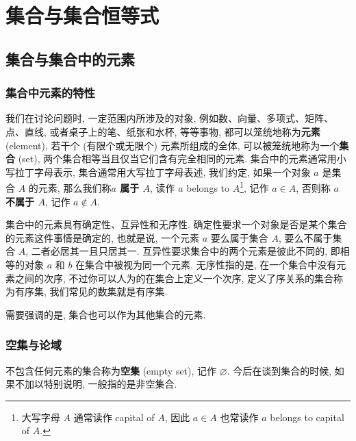 \documentclass[10pt,UTF8]{book} %
\begin{document}
\section{集合与集合恒等式}

\subsection{集合与集合中的元素}

\subsubsection{集合中元素的特性}

我们在讨论问题时, 一定范围内所涉及的对象, 例如数、向量、多项式、矩阵、点、直线,
或者桌子上的笔、纸张和水杯, 等等事物, 都可以笼统地称为\textbf{元素} (element),
若干个 (有限个或无限个) 元素所组成的全体, 可以被笼统地称为一个\textbf{集合} (set),
两个集合相等当且仅当它们含有完全相同的元素.
集合中的元素通常用小写拉丁字母表示, 集合通常用大写拉丁字母表述, 我们约定,
如果一个对象 $a$ 是集合 $A$ 的元素, 那么我们称\textbf{$a$ 属于 $A$}, 读作 $a$ belongs to
$A$\footnote{
    大写字母 $A$ 通常读作 capital of $A$, 因此 $a \in A$ 也常读作 $a$ belongs to 
    capital of $A$.
}, 记作 $a \in A$, 否则称 \textbf{$a$ 不属于 $A$}, 记作 $a \notin A$.

集合中的元素具有确定性、互异性和无序性. 确定性要求一个对象是否是某个集合的元素这件事情是确定的,
也就是说, 一个元素 $a$ 要么属于集合 $A$, 要么不属于集合 $A$, 二者必居其一且只居其一.
互异性要求集合中的两个元素是彼此不同的, 即相等的对象 $a$ 和 $b$ 在集合中被视为同一个元素.
无序性指的是, 在一个集合中没有元素之间的次序, 不过你可以人为的在集合上定义一个次序,
定义了序关系的集合称为有序集, 我们常见的数集就是有序集.

需要强调的是, 集合也可以作为其他集合的元素.

\subsubsection{空集与论域}

不包含任何元素的集合称为\textbf{空集} (empty set), 记作 $\varnothing$.
今后在谈到集合的时候, 如果不加以特别说明, 一般指的是非空集合.
\end{document}
